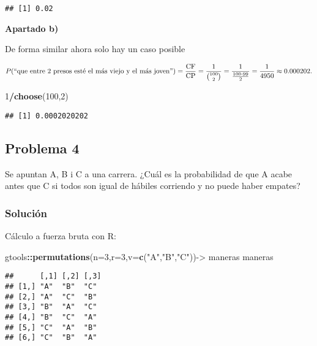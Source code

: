 \documentclass[
]{article}
\newenvironment{Shaded}{\begin{snugshade}}{\end{snugshade}}
\newcommand{\DataTypeTok}[1]{\textcolor[rgb]{0.13,0.29,0.53}{#1}}
\newcommand{\DecValTok}[1]{\textcolor[rgb]{0.00,0.00,0.81}{#1}}
\newcommand{\KeywordTok}[1]{\textcolor[rgb]{0.13,0.29,0.53}{\textbf{#1}}}
\newcommand{\NormalTok}[1]{#1}
\newcommand{\OperatorTok}[1]{\textcolor[rgb]{0.81,0.36,0.00}{\textbf{#1}}}
\newcommand{\StringTok}[1]{\textcolor[rgb]{0.31,0.60,0.02}{#1}}
\begin{document}
\begin{verbatim}
## [1] 0.02
\end{verbatim}

\textbf{Apartado b)}

De forma similar ahora solo hay un caso posible

\[P(``\mbox{que entre 2 presos esté el más viejo y el más joven}")=\frac{\mbox{CF}}{\mbox{CP}}=
\frac{1}{{100\choose 2}}=\frac{1}{\frac{100\cdot 99}{2}}=\frac{1}{4950}\approx 0.000202.\]

\begin{Shaded}
\begin{Highlighting}[]
\DecValTok{1}\OperatorTok{/}\KeywordTok{choose}\NormalTok{(}\DecValTok{100}\NormalTok{,}\DecValTok{2}\NormalTok{)}
\end{Highlighting}
\end{Shaded}

\begin{verbatim}
## [1] 0.0002020202
\end{verbatim}

\hypertarget{problema-4}{%
\subsection{Problema 4}\label{problema-4}}

Se apuntan A, B i C a una carrera. ¿Cuál es la probabilidad de que A
acabe antes que C si todos son igual de hábiles corriendo y no puede
haber empates?

\hypertarget{soluciuxf3n-3}{%
\subsubsection{Solución}\label{soluciuxf3n-3}}

Cálculo a fuerza bruta con R:

\begin{Shaded}
\begin{Highlighting}[]
\NormalTok{gtools}\OperatorTok{::}\KeywordTok{permutations}\NormalTok{(}\DataTypeTok{n=}\DecValTok{3}\NormalTok{,}\DataTypeTok{r=}\DecValTok{3}\NormalTok{,}\DataTypeTok{v=}\KeywordTok{c}\NormalTok{(}\StringTok{"A"}\NormalTok{,}\StringTok{"B"}\NormalTok{,}\StringTok{"C"}\NormalTok{))->}\StringTok{ }\NormalTok{maneras}
\NormalTok{maneras}
\end{Highlighting}
\end{Shaded}

\begin{verbatim}
##      [,1] [,2] [,3]
## [1,] "A"  "B"  "C" 
## [2,] "A"  "C"  "B" 
## [3,] "B"  "A"  "C" 
## [4,] "B"  "C"  "A" 
## [5,] "C"  "A"  "B" 
## [6,] "C"  "B"  "A"
\end{verbatim}
\end{document}
